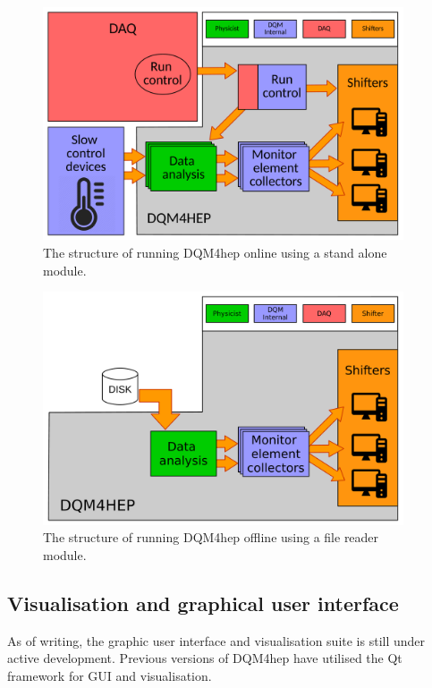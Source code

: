 \begin{figure}
	\centering
	\includegraphics[width=0.95\textwidth]{../Pictures/StandaloneModuleArchitecture.pdf}
	\caption{The structure of running DQM4hep online using a stand alone module.}
	\label{figure:daq/dqm4hep/standalone-module}
\end{figure}

\begin{figure}
	\centering
	\includegraphics[width=0.95\textwidth]{../Pictures/FileReaderModuleArchitecture.pdf}
	\caption{The structure of running DQM4hep offline using a file reader module.}
	\label{figure:daq/dqm4hep/file-reader}
\end{figure}

\subsection{Visualisation and graphical user interface}
As of writing, the graphic user interface and visualisation suite is still under active development. Previous versions of DQM4hep have utilised the Qt framework for GUI and visualisation.

